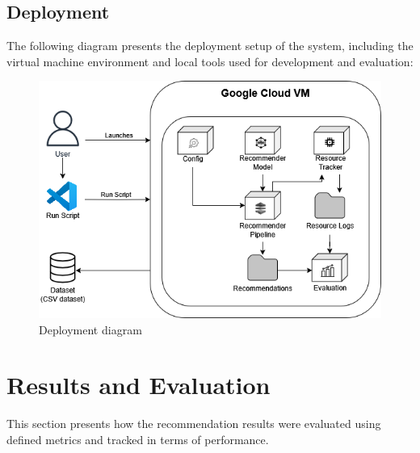\documentclass[\myFontSize,a4paper,oneside,english,hidelinks]{article}
\begin{document}
\subsection{Deployment}
The following diagram presents the deployment setup of the system, including the virtual machine environment and local tools used for development and evaluation:
\begin{figure}[h!]
    \centering
    \includegraphics[width=1\textwidth]{img/deployment_diagram.drawio.png}
    \caption{Deployment diagram}
    \label{fig:deployment_diagram}
\end{figure}


%
%

\clearpage
\section{Results and Evaluation}
This section presents how the recommendation results were evaluated using defined metrics and tracked in terms of performance.\\
\end{document}
